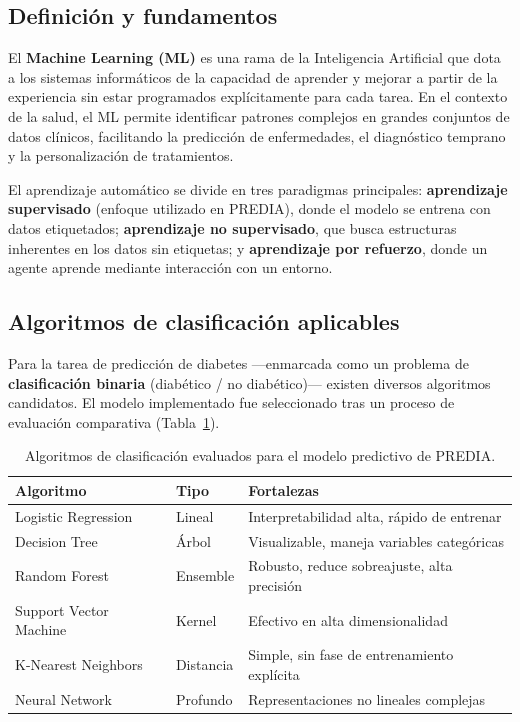 \documentclass[12pt, letterpaper, twoside]{report}
\newcommand{\thead}[1]{\textbf{\sffamily #1}}
\newcommand{\trow}{}
\begin{document}
\subsection{Definición y fundamentos}

El \textbf{Machine Learning (ML)} es una rama de la Inteligencia Artificial que dota a los sistemas informáticos de la capacidad de aprender y mejorar a partir de la experiencia sin estar programados explícitamente para cada tarea. En el contexto de la salud, el ML permite identificar patrones complejos en grandes conjuntos de datos clínicos, facilitando la predicción de enfermedades, el diagnóstico temprano y la personalización de tratamientos.

El aprendizaje automático se divide en tres paradigmas principales: \textbf{aprendizaje supervisado} (enfoque utilizado en PREDIA), donde el modelo se entrena con datos etiquetados; \textbf{aprendizaje no supervisado}, que busca estructuras inherentes en los datos sin etiquetas; y \textbf{aprendizaje por refuerzo}, donde un agente aprende mediante interacción con un entorno.

\subsection{Algoritmos de clasificación aplicables}

Para la tarea de predicción de diabetes —enmarcada como un problema de \textbf{clasificación binaria} (diabético / no diabético)— existen diversos algoritmos candidatos. El modelo implementado fue seleccionado tras un proceso de evaluación comparativa (Tabla~\ref{tab:algoritmos_ml}).

\begin{table}[H]
  \centering
  \caption{Algoritmos de clasificación evaluados para el modelo predictivo de PREDIA.}
  \label{tab:algoritmos_ml}
  \begin{tabularx}{\linewidth}{l l X}
    \toprule
    \thead{Algoritmo} & \thead{Tipo} & \thead{Fortalezas} \\
    \midrule
    \trow Logistic Regression & Lineal & Interpretabilidad alta, rápido de entrenar \\
    Decision Tree & Árbol & Visualizable, maneja variables categóricas \\
    \trow Random Forest & Ensemble & Robusto, reduce sobreajuste, alta precisión \\
    Support Vector Machine & Kernel & Efectivo en alta dimensionalidad \\
    \trow K-Nearest Neighbors & Distancia & Simple, sin fase de entrenamiento explícita \\
    Neural Network & Profundo & Representaciones no lineales complejas \\
    \bottomrule
  \end{tabularx}
\end{table}
\end{document}
